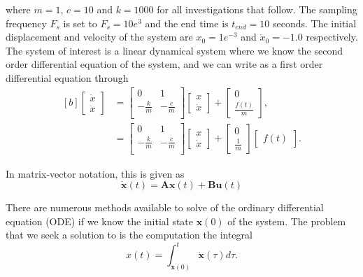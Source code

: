 \documentclass{article}
\begin{document}
where $m = 1$, $c = 10$ and $k = 1000$ for all investigations that follow. The sampling frequency $F_s$ is set to $F_s = 10e^3$ and the end time is $t_{end}=10$ seconds. The initial displacement and velocity of the system are $x_0 = 1e^{-3}$ and $\dot{x}_0 = -1.0$ respectively. The system of interest is a linear dynamical system where we know the second order differential equation of the system, and we can write as a first order differential equation through
\begin{equation}
\begin{aligned}[b]
\begin{bmatrix}
\dot{x} \\
\ddot{x}
\end{bmatrix} &= 
\begin{bmatrix}
0 & 1 \\
-\frac{k}{m} & -\frac{c}{m} \\
\end{bmatrix}
\begin{bmatrix}
x \\
\dot{x}
\end{bmatrix}+
\begin{bmatrix}
0 \\
\frac{f(t)}{m}
\end{bmatrix}, \\
&=
\begin{bmatrix}
0 & 1 \\
-\frac{k}{m} & -\frac{c}{m} \\
\end{bmatrix}
\begin{bmatrix}
x \\
\dot{x}
\end{bmatrix}+
\begin{bmatrix}
0 \\
\frac{1}{m}
\end{bmatrix}
\begin{bmatrix}
f(t)
\end{bmatrix}.
\end{aligned}
\end{equation}

In matrix-vector notation, this is given as
\begin{equation}
\dot{\mathbf{x}}(t) = \mathbf{A}\mathbf{x}(t) + \mathbf{B}\mathbf{u}(t)
\end{equation}

There are numerous methods available to solve of the ordinary differential equation (ODE) if we know the initial state $\mathbf{x}(0)$ of the system. The problem that we seek a solution to is the computation the integral
\begin{equation}
x(t) = \int_{\mathbf{x}(0)}^{t}\dot{\mathbf{x}}(\tau)d\tau.
\end{equation}
\end{document}
